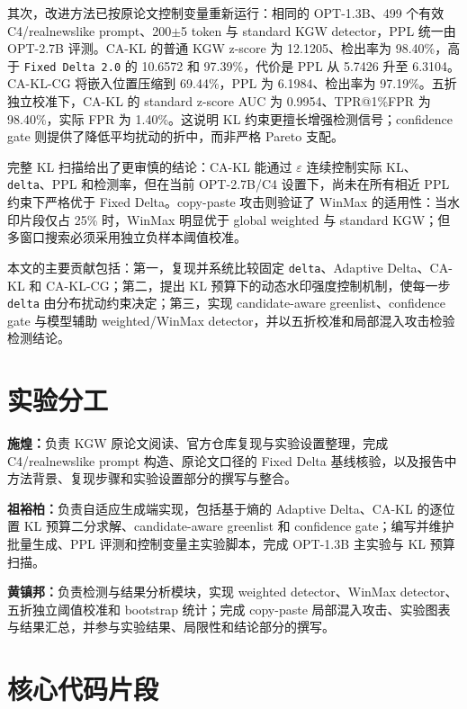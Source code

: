 \documentclass[a4paper,UTF8,zihao=5]{ctexart}
\newcommand{\method}{CA-KL}
\newcommand{\fullmethod}{CA-KL-CG}
\begin{document}
其次，改进方法已按原论文控制变量重新运行：相同的 OPT-1.3B、499 个有效 C4/realnewslike prompt、200$\pm$5 token 与 standard KGW detector，PPL 统一由 OPT-2.7B 评测。\method{} 的普通 KGW z-score 为 12.1205、检出率为 98.40\%，高于 \texttt{Fixed Delta 2.0} 的 10.6572 和 97.39\%，代价是 PPL 从 5.7426 升至 6.3104。\fullmethod{} 将嵌入位置压缩到 69.44\%，PPL 为 6.1984、检出率为 97.19\%。五折独立校准下，\method{} 的 standard z-score AUC 为 0.9954、TPR@1\%FPR 为 98.40\%，实际 FPR 为 1.40\%。这说明 KL 约束更擅长增强检测信号；confidence gate 则提供了降低平均扰动的折中，而非严格 Pareto 支配。

完整 KL 扫描给出了更审慎的结论：CA-KL 能通过 $\varepsilon$ 连续控制实际 KL、\texttt{delta}、PPL 和检测率，但在当前 OPT-2.7B/C4 设置下，尚未在所有相近 PPL 约束下严格优于 Fixed Delta。copy-paste 攻击则验证了 WinMax 的适用性：当水印片段仅占 25\% 时，WinMax 明显优于 global weighted 与 standard KGW；但多窗口搜索必须采用独立负样本阈值校准。

本文的主要贡献包括：第一，复现并系统比较固定 \texttt{delta}、Adaptive Delta、\method{} 和 \fullmethod{}；第二，提出 KL 预算下的动态水印强度控制机制，使每一步 \texttt{delta} 由分布扰动约束决定；第三，实现 candidate-aware greenlist、confidence gate 与模型辅助 weighted/WinMax detector，并以五折校准和局部混入攻击检验检测结论。

\section{实验分工}

\noindent\textbf{施煌：}负责 KGW 原论文阅读、官方仓库复现与实验设置整理，完成 C4/realnewslike prompt 构造、原论文口径的 Fixed Delta 基线核验，以及报告中方法背景、复现步骤和实验设置部分的撰写与整合。

\noindent\textbf{祖裕柏：}负责自适应生成端实现，包括基于熵的 Adaptive Delta、CA-KL 的逐位置 KL 预算二分求解、candidate-aware greenlist 和 confidence gate；编写并维护批量生成、PPL 评测和控制变量主实验脚本，完成 OPT-1.3B 主实验与 KL 预算扫描。

\noindent\textbf{黄镇邦：}负责检测与结果分析模块，实现 weighted detector、WinMax detector、五折独立阈值校准和 bootstrap 统计；完成 copy-paste 局部混入攻击、实验图表与结果汇总，并参与实验结果、局限性和结论部分的撰写。


\clearpage



\appendix
\section{核心代码片段}
\end{document}
